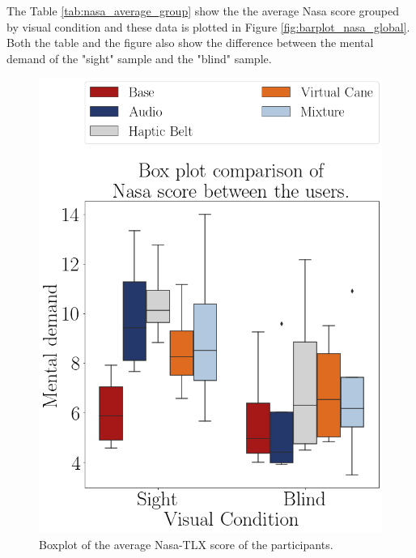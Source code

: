 

The Table \ref{tab:nasa_average_group} show the the average Nasa score grouped by visual condition and these data is plotted in Figure \ref{fig:barplot_nasa_global}. Both the table and the figure also show the difference between the mental demand of the "sight" sample and the "blind" sample.




\begin{figure}[!htb]
    \begin{minipage}{.45\linewidth}
        \centering
        \includegraphics[width = \linewidth]{Resultados/Nasa/Figuras/png/boxplot_nasa_avg_scene.png}
        \caption{Boxplot of the average Nasa-TLX score of the participants.}
        \label{fig:boxplot_nasa_scene}

\end{minipage}
\end{figure}
